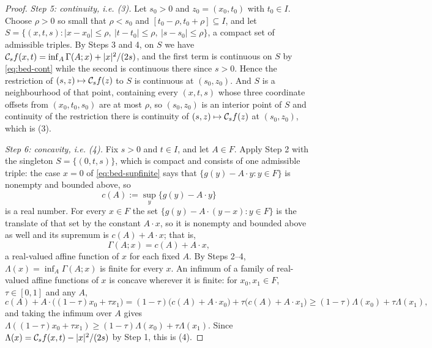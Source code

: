 \begin{proof}
\emph{Step 5: continuity, i.e. (3).}
Let $s_0>0$ and $z_0=(x_0,t_0)$ with $t_0\in I$. Choose $\rho>0$ so small that
$\rho<s_0$ and $[t_0-\rho,t_0+\rho]\subseteq I$, and let
$S=\{(x,t,s):|x-x_0|\le\rho,\ |t-t_0|\le\rho,\ |s-s_0|\le\rho\}$, a compact set
of admissible triples. By Steps 3 and 4, on $S$ we have
$\mathcal{C}_sf(x,t)=\inf_A\Gamma(A;x)+|x|^2/(2s)$, and the first term is continuous on
$S$ by \eqref{eq:bed-cont} while the second is continuous there since $s>0$.
Hence the restriction of $(s,z)\mapsto\mathcal{C}_sf(z)$ to $S$ is continuous at
$(s_0,z_0)$. And $S$ is a neighbourhood of that point, containing every
$(x,t,s)$ whose three coordinate offsets from $(x_0,t_0,s_0)$ are at most
$\rho$, so $(s_0,z_0)$ is an interior point of $S$ and continuity of the
restriction there is continuity of $(s,z)\mapsto\mathcal{C}_sf(z)$ at $(s_0,z_0)$,
which is (3).

\emph{Step 6: concavity, i.e. (4).}
Fix $s>0$ and $t\in I$, and let $A\in F$. Apply Step 2 with the singleton
$S=\{(0,t,s)\}$, which is compact and consists of one admissible triple: the
case $x=0$ of \eqref{eq:bed-supfinite} says that
$\{g(y)-A\cdot y:y\in F\}$ is nonempty and bounded above, so
\[
  c(A):=\sup_y\{g(y)-A\cdot y\}
\]
is a real number. For every $x\in F$ the set
$\{g(y)-A\cdot(y-x):y\in F\}$ is the translate of that set by the constant
$A\cdot x$, so it is nonempty and bounded above as well and its supremum is
$c(A)+A\cdot x$; that is,
\[
  \Gamma(A;x)=c(A)+A\cdot x ,
\]
a real-valued affine function of $x$ for each fixed $A$. By Steps 2--4,
$\Lambda(x)=\inf_A\Gamma(A;x)$ is finite for every $x$. An infimum of a family
of real-valued affine functions of $x$ is concave wherever it is finite: for
$x_0,x_1\in F$, $\tau\in[0,1]$ and any $A$,
\[
  c(A)+A\cdot\bigl((1-\tau)x_0+\tau x_1\bigr)
   =(1-\tau)\bigl(c(A)+A\cdot x_0\bigr)+\tau\bigl(c(A)+A\cdot x_1\bigr)
   \ge(1-\tau)\Lambda(x_0)+\tau\Lambda(x_1),
\]
and taking the infimum over $A$ gives
$\Lambda((1-\tau)x_0+\tau x_1)\ge(1-\tau)\Lambda(x_0)+\tau\Lambda(x_1)$. Since
$\Lambda(x)=\mathcal{C}_sf(x,t)-|x|^2/(2s)$ by Step 1, this is (4).


\end{proof}

